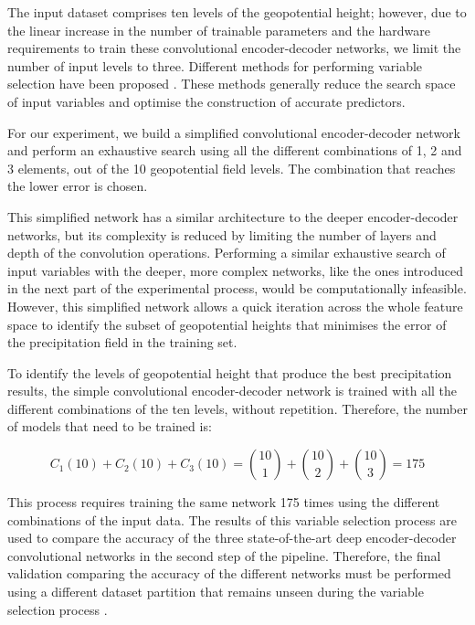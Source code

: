 \documentclass[twocol]{ametsoc}
\begin{document}
The input dataset comprises ten levels of the geopotential height; however, due to the linear increase in the number of trainable parameters and the hardware requirements to train these convolutional encoder-decoder networks, we limit the number of input levels to three. Different methods for performing variable selection have been proposed \citep{saeys2007review}. These methods generally reduce the search space of input variables and optimise the construction of accurate predictors. 

For our experiment, we build a simplified convolutional encoder-decoder network and perform an exhaustive search using all the different combinations of 1, 2 and 3 elements, out of the 10 geopotential field levels. The combination that reaches the lower error is chosen. 

This simplified network has a similar architecture to the deeper encoder-decoder networks, but its complexity is reduced by limiting the number of layers and depth of the convolution operations. Performing a similar exhaustive search of  input variables with the deeper, more complex networks, like the ones introduced in the next part of the experimental process, would be computationally infeasible. However, this simplified network allows a quick iteration across the whole feature space to identify the subset of geopotential heights that minimises the error of the precipitation field in the training set.

To identify the levels of geopotential height that produce the best precipitation results, the simple convolutional encoder-decoder network is trained with all the different combinations of the ten levels, without repetition. Therefore, the number of models that need to be trained is:

\begin{equation}
C_1(10) + C_2(10) + C_3(10) = \binom{10}{1} + \binom{10}{2} + \binom{10}{3} = 175
\end{equation}

This process requires training the same network 175 times using the different combinations of the input data. The results of this variable selection process are used to compare the accuracy of the three state-of-the-art deep encoder-decoder convolutional networks in the second step of the pipeline. Therefore, the final validation comparing the accuracy of the different networks must be performed using a different dataset partition that remains unseen during the variable selection process  \citep{reunanen2003overfitting}.
\end{document}
